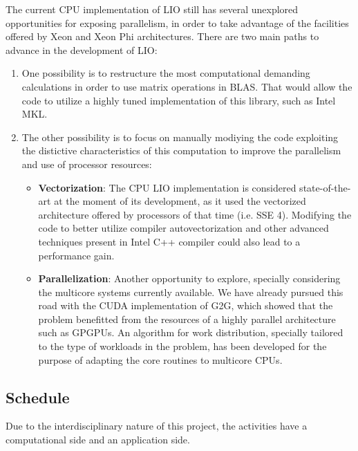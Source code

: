 \documentclass[a4paper,10pt]{article}
\begin{document}
The current CPU implementation of LIO still has several unexplored opportunities for exposing parallelism, in order to take advantage of the facilities offered by Xeon and Xeon Phi architectures.
There are two main paths to advance in the development of LIO:
\begin{enumerate}
\item One possibility is to restructure the most computational demanding calculations in order to use matrix operations in BLAS. 
That would allow the code to utilize a highly tuned implementation of this library, such as Intel MKL.

\item The other possibility is to focus on manually modiying the code exploiting the distictive characteristics of this computation to improve the parallelism and use of processor resources:
\begin{itemize}
\item \textbf{Vectorization}: The CPU LIO implementation is considered state-of-the-art at the moment of its development, as it used the vectorized architecture offered by processors of that time (i.e. SSE 4). 
Modifying the code to better utilize compiler autovectorization and other advanced techniques present in Intel C++ compiler could also lead to a performance gain.

\item \textbf{Parallelization}: Another opportunity to explore, specially considering the multicore systems currently available. We have already pursued this road with the CUDA implementation of G2G, which showed that the problem benefitted from the resources of a highly parallel architecture such as GPGPUs. 
An algorithm for work distribution, specially tailored to the type of workloads in the problem, has been developed for the purpose of adapting the core routines to multicore CPUs.

\end{itemize}


\end{enumerate}




\subsection{Schedule}

Due to the interdisciplinary nature of this project, the activities have a computational side and an application side.
\end{document}
